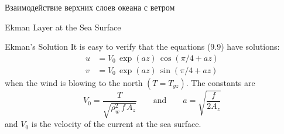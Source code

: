 \begin{chapter}{Взаимодействие верхних слоев океана с ветром}
\begin{section}{Ekman Layer at the Sea Surface}
\begin{paragraph}{Ekman's Solution}
It is easy to verify that the equations (9.9) have solutions:
\begin{subequations}
\begin{align}
u &=  V_0\,\exp(az)\,\cos(\pi/4 + az)  \\
v &=  V_0\,\exp(az)\,\sin(\pi/4 + az)
\end{align}
\end{subequations}
when the wind is blowing to the north $(T = T_{yz})$. The constants
are
\begin{equation}
V_0 = \frac{T}{\sqrt{\rho^2_w\,f\,A_z}} \qquad \text{and} \qquad
a=\sqrt{\frac{f}{2A_z}}
\end{equation}
and $V_0$ is the velocity of the current at the sea surface.
%


\end{paragraph}
\end{section}
\end{chapter}
